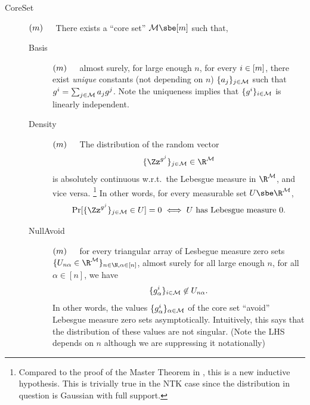 \documentclass[main.tex]{subfiles}
\begin{document}
\begin{description}
\item[CoreSet\label{IH:coreSet}]\!\!\!$(m)$\ \ \ 
    There exists a ``core set'' $\coreset \sbe [\MM]$ such that, 
  \begin{description}
    \item[Basis\label{prop:basis}]\!\!\!$(m)$\ \ \ 
      almost surely, for large enough $n$, for every $i \in [m]$, there exist \emph{unique} constants (not depending on $n$) $\{a_j\}_{j \in \mathcal{M}}$ such that $g^i = \sum_{j \in \mathcal{M}} a_j g^j$.
      Note the uniqueness implies that $\{g^i\}_{i \in \mathcal{M}}$ is linearly independent.
    \item[Density\label{prop:density}]\!\!\!$(m)$\ \ \ 
      The distribution of the random vector
      \[\{\Zz^{g^j}\}_{j \in \coreset} \in \R^{\coreset}\]
      is absolutely continuous w.r.t.\ the Lebesgue measure in $\R^{\coreset}$, and vice versa.%
      \footnote{
        {Compared to the proof of the Master Theorem in \citet{yangTP2}, this is a new inductive hypothesis.
        This is trivially true in the NTK case since the distribution in question is Gaussian with full support.}}
      In other words, for every measurable set $U \sbe \R^{\coreset}$,
      \[\Pr[\{\Zz^{g^j}\}_{j \in \coreset} \in U] = 0 \iff \text{$U$ has Lebesgue measure 0.}\]
    \item[NullAvoid\label{prop:nullAvoid}]\!\!\!$(m)$\ \ \ 
      for every triangular array of Lesbegue measure zero sets $\{U_{n\alpha} \in \R^{\coreset} \}_{n \in \N, \alpha \in [n]}$, almost surely for all large enough $n$, for all $\alpha \in [n]$, we have
      \[\{g^i_\alpha\}_{i \in \mathcal{M}} \not \in U_{n\alpha}.\]
      In other words, the values $\{g^i_\alpha\}_{\alpha \in \mathcal{M}}$ of the core set ``avoid'' Lebesgue measure zero sets asymptotically.
      Intuitively, this says that the distribution of these values are not singular.
      (Note the LHS depends on $n$ although we are suppressing it notationally)
  \end{description}
\end{description}
\end{document}
